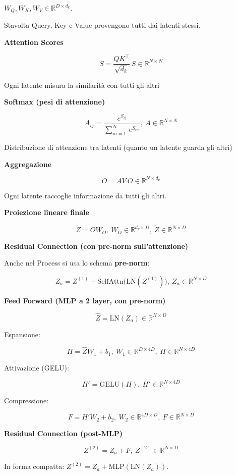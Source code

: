 \documentclass[
  11pt,
]{article}
\begin{document}
\(W_{Q},W_{K},W_{V} \in \mathbb{R}^{D \times d_{k}}\).

Stavolta Query, Key e Value provengono tutti dai latenti stessi.

\textbf{Attention Scores}

\[S = \frac{QK^{\top}}{\sqrt{d_{k}}}\ S \in \mathbb{R}^{N \times N}\]

Ogni latente misura la similarità con tutti gli altri

\textbf{Softmax (pesi di attenzione)}

\[A_{ij} = \frac{e^{S_{ij}}}{\sum_{m = 1}^{N}\, e^{S_{im}}},\ A \in \mathbb{R}^{N \times N}\]

Distribuzione di attenzione tra latenti (quanto un latente guarda gli
altri)

\textbf{Aggregazione}

\[O = AV\ O \in \mathbb{R}^{N \times d_{v}}\]

Ogni latente raccoglie informazione da tutti gli altri.

\textbf{Proiezione lineare finale}

\[\widetilde{Z} = OW_{O},\ W_{O} \in \mathbb{R}^{d_{v} \times D},\ \widetilde{Z} \in \mathbb{R}^{N \times D}\]

\textbf{Residual Connection (con pre-norm sull'attenzione)}

Anche nel Process si usa lo schema \textbf{pre-norm}:

\[Z_{a} = Z^{(1)} + \text{SelfAttn}\!\bigl(\mathrm{LN}(Z^{(1)})\bigr),\ Z_{a} \in \mathbb{R}^{N \times D}\]

\textbf{Feed Forward (MLP a 2 layer, con pre-norm)}

\[\widehat{Z} = \mathrm{LN}(Z_{a}) \in \mathbb{R}^{N \times D}\]

Espansione:

\[H = \widehat{Z}W_{1} + b_{1},\ W_{1} \in \mathbb{R}^{D \times 4D},\ H \in \mathbb{R}^{N \times 4D}\]

Attivazione (GELU):

\[H' = \mathrm{GELU}(H),\ H' \in \mathbb{R}^{N \times 4D}\]

Compressione:

\[F = H'W_{2} + b_{2},\ W_{2} \in \mathbb{R}^{4D \times D},\ F \in \mathbb{R}^{N \times D}\]

\textbf{Residual Connection (post-MLP)}

\[Z^{(2)} = Z_{a} + F,\ Z^{(2)} \in \mathbb{R}^{N \times D}\]

In forma compatta: $Z^{(2)} = Z_{a} + \mathrm{MLP}(\mathrm{LN}(Z_{a}))$.
\end{document}
